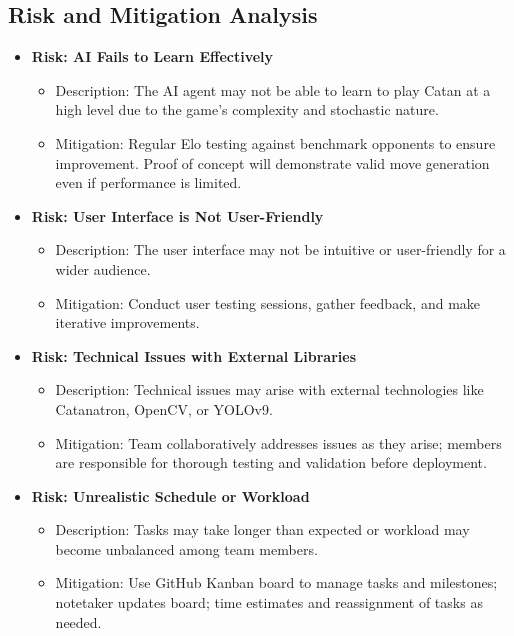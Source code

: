 \documentclass{article}
\begin{document}
\subsection{Risk and Mitigation Analysis}\label{subsec:risk}
\begin{itemize}
    \item \textbf{Risk: AI Fails to Learn Effectively}
    \begin{itemize}
        \item Description: The AI agent may not be able to learn to play Catan at a high level due to the game's complexity and stochastic nature.
        \item Mitigation: Regular Elo testing against benchmark opponents to ensure improvement. Proof of concept will demonstrate valid move generation even if performance is limited.
    \end{itemize}

    \item \textbf{Risk: User Interface is Not User-Friendly}
    \begin{itemize}
        \item Description: The user interface may not be intuitive or user-friendly for a wider audience.
        \item Mitigation: Conduct user testing sessions, gather feedback, and make iterative improvements.
    \end{itemize}

    \item \textbf{Risk: Technical Issues with External Libraries}
    \begin{itemize}
        \item Description: Technical issues may arise with external technologies like Catanatron, OpenCV, or YOLOv9.
        \item Mitigation: Team collaboratively addresses issues as they arise; members are responsible for thorough testing and validation before deployment.
    \end{itemize}

    \item \textbf{Risk: Unrealistic Schedule or Workload}
    \begin{itemize}
        \item Description: Tasks may take longer than expected or workload may become unbalanced among team members.
        \item Mitigation: Use GitHub Kanban board to manage tasks and milestones; notetaker updates board; time estimates and reassignment of tasks as needed.
    \end{itemize}
\end{itemize}
\end{document}
